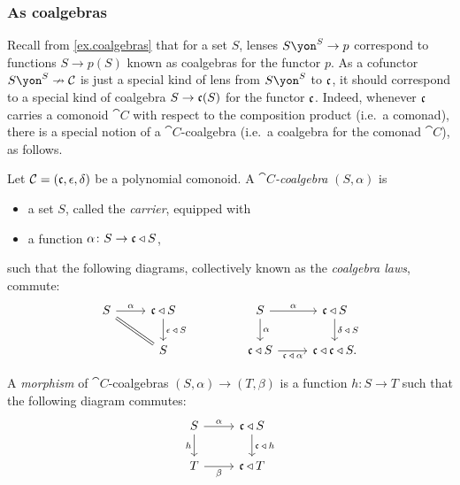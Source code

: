 \documentclass[Book-Poly]{subfiles}
\begin{document}
\subsubsection{As coalgebras}

Recall from \cref{ex.coalgebras} that for a set $S$, lenses $S\yon^S\to p$ correspond to functions $S\to p(S)$ known as coalgebras for the functor $p$.
As a cofunctor $S\yon^S\cof\cat{C}$ is just a special kind of lens from $S\yon^S$ to $\mathfrak{c}$, it should correspond to a special kind of coalgebra $S\to\mathfrak{c}(S)$ for the functor $\mathfrak{c}$.
Indeed, whenever $\mathfrak{c}$ carries a comonoid $\cat{C}$ with respect to the composition product (i.e.\ a comonad), there is a special notion of a $\cat{C}$-coalgebra (i.e.\ a coalgebra for the comonad $\cat{C}$), as follows.

\begin{definition}\label{def.coalgebra}
Let $\mathcal{C}=(\mathfrak{c},\epsilon,\delta)$ be a polynomial comonoid.
A \emph{$\cat{C}$-coalgebra} $(S,\alpha)$ is
\begin{itemize}
    \item a set $S$, called the \emph{carrier}, equipped with
    \item a function $\alpha\colon S\to\mathfrak{c}\mathbin{\triangleleft} S$,
\end{itemize}
such that the following diagrams, collectively known as the \emph{coalgebra laws}, commute:
\begin{equation} \label{eqn.coalg_laws}
\begin{tikzcd}
    S \ar[r, "\alpha"] \ar[dr, equal] &
    \car{c}\tri S \ar[d, "\epsilon\:\tri\:S"] \\
    & S
\end{tikzcd}
\hspace{.6in}
\begin{tikzcd}
    S \ar[d, "\alpha"] \ar[r, "\alpha"] &
    \car{c}\tri S \ar[d, "\delta\:\tri\:S"] \\
    \car{c}\tri S \ar[r, "\car{c}\:\tri\:\alpha"'] & 
	\car{c}\tri\car{c}\tri S.
\end{tikzcd}
\end{equation}

A \emph{morphism} of $\cat{C}$-coalgebras $(S,\alpha)\to(T,\beta)$ is a function $h\colon S\to T$ such that the following diagram commutes:
\[
\begin{tikzcd}
    S \ar[d, "h"'] \ar[r, "\alpha"] &
    \car{c}\tri S \ar[d, "\car{c}\:\tri\:h"] \\
    T \ar[r, "\beta"'] &
    \car{c}\tri T
\end{tikzcd}
\]
\end{definition}
\end{document}
